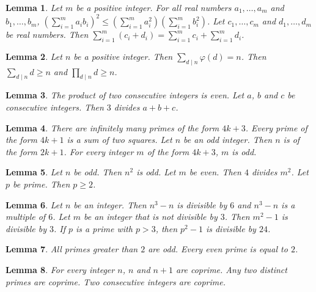 \documentclass{article}
\newtheorem{lemma}{Lemma}
\begin{document}
\begin{lemma}\label{two-sequences}
Let $m$ be a positive integer. For all real numbers $a_1,\ldots,a_m$ and $b_1,\ldots,b_m$, $\left(\sum_{i=1}^m a_ib_i\right)^2\le\left(\sum_{i=1}^m a_i^2\right)\left(\sum_{i=1}^m b_i^2\right)$. Let $c_1,\ldots,c_m$ and $d_1,\ldots,d_m$ be real numbers. Then $\sum_{i=1}^m(c_i+d_i)=\sum_{i=1}^m c_i+\sum_{i=1}^m d_i$.
\end{lemma}

\begin{lemma}\label{divisor-sums}
Let $n$ be a positive integer. Then $\sum_{d\mid n}\varphi(d)=n$. Then $\sum_{d\mid n}d\ge n$ and $\prod_{d\mid n}d\ge n$.
\end{lemma}

\begin{lemma}\label{consecutive}
The product of two consecutive integers is even. Let $a$, $b$ and $c$ be consecutive integers. Then $3$ divides $a+b+c$.
\end{lemma}

\begin{lemma}\label{of-the-form}
There are infinitely many primes of the form $4k+3$. Every prime of the form $4k+1$ is a sum of two squares. Let $n$ be an odd integer. Then $n$ is of the form $2k+1$. For every integer $m$ of the form $4k+3$, $m$ is odd.
\end{lemma}

\begin{lemma}\label{words-without-noun}
Let $n$ be odd. Then $n^2$ is odd. Let $m$ be even. Then $4$ divides $m^2$. Let $p$ be prime. Then $p\ge 2$.
\end{lemma}

\begin{lemma}\label{divisibility-words}
Let $n$ be an integer. Then $n^3-n$ is divisible by $6$ and $n^3-n$ is a multiple of $6$. Let $m$ be an integer that is not divisible by $3$. Then $m^2-1$ is divisible by $3$. If $p$ is a prime with $p>3$, then $p^2-1$ is divisible by $24$.
\end{lemma}

\begin{lemma}\label{all-are}
All primes greater than $2$ are odd. Every even prime is equal to $2$.
\end{lemma}

\begin{lemma}\label{two-together}
For every integer $n$, $n$ and $n+1$ are coprime. Any two distinct primes are coprime. Two consecutive integers are coprime.
\end{lemma}
\end{document}
